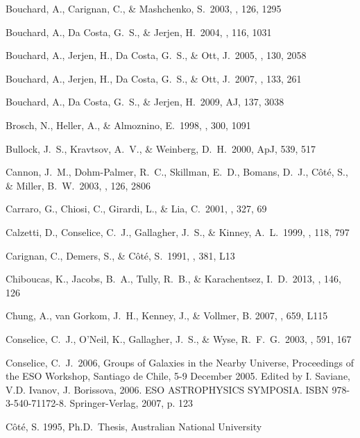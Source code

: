 \documentclass[12pt,onecolumn]{emulateapj}
\begin{document}
\begin{thebibliography}{}
Bouchard, A., Carignan, C., \& Mashchenko, S.\ 2003, \aj, 126, 1295 

Bouchard, A., Da Costa, G.~S., \& Jerjen, H.\ 2004, \pasp, 116, 1031 

Bouchard, A., Jerjen, H., Da Costa, G.~S., \& Ott, J.\ 2005, \aj, 130, 2058 

Bouchard, A., Jerjen, H., Da Costa, G.~S., \& Ott, J.\ 2007, \aj, 133, 261 

Bouchard, A., Da Costa, G.~S., \& Jerjen, H.\ 2009, AJ, 137, 3038

Brosch, N., Heller, A., \& Almoznino, E.\ 1998, \mnras , 300, 1091

Bullock, J.~S., Kravtsov, A.~V., \& Weinberg, D.~H.\ 2000, ApJ, 539, 517

Cannon, J.~M., Dohm-Palmer, R.~C., Skillman, E.~D., Bomans, D.~J., 
C{\^o}t{\'e}, S., \& Miller, B.~W.\ 2003, \aj, 126, 2806 

Carraro, G., Chiosi, C., Girardi, L., \& Lia, C.\ 2001, \mnras, 327, 69 

Calzetti, D., Conselice, C.~J., Gallagher, J.~S., \& Kinney, A.~L.\ 1999, \aj, 118, 797

Carignan, C., Demers, S., \& C\^ot\'e, S.\ 1991, \apj, 381, L13

Chiboucas, K., Jacobs, B.~A., Tully, R.~B., \& Karachentsez, I.~D.\ 2013, \aj, 146, 126
 
Chung, A., van Gorkom, J.~H., Kenney, J., \& Vollmer, B. 2007, \apj, 659, L115 

Conselice, C.~J., O'Neil, K., Gallagher, J.~S., \& Wyse, R.~F.~G.\ 2003, \apj, 591, 167 

Conselice, C.~J.\ 2006, Groups of Galaxies in the Nearby Universe, Proceedings of the ESO Workshop, 
Santiago de Chile, 5-9 December 2005. Edited by I. Saviane, V.D. Ivanov, J. Borissova, 2006. 
ESO ASTROPHYSICS SYMPOSIA. ISBN 978-3-540-71172-8. Springer-Verlag, 2007, p. 123 

C\^ot\'e, S. 1995, Ph.D.\ Thesis, Australian National University


\end{thebibliography}
\end{document}

